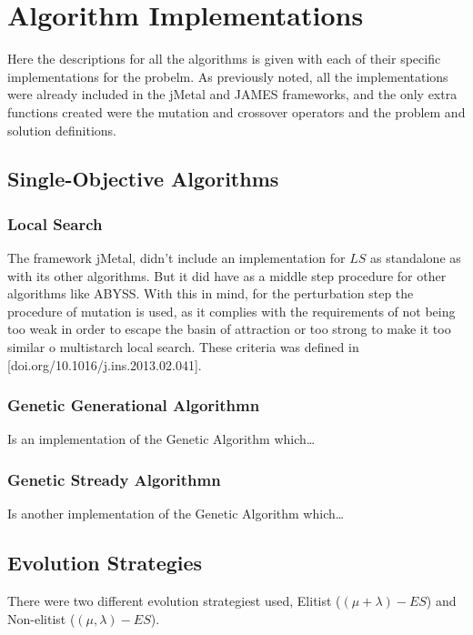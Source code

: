 \section{Algorithm Implementations}

Here the descriptions for all the algorithms is given with each of their specific implementations for the probelm. As previously noted, all the implementations were already included in the jMetal and JAMES frameworks, and the only extra functions created were the mutation and crossover operators and the problem and solution definitions.

\subsection{Single-Objective Algorithms}

\subsubsection{Local Search}

The framework jMetal, didn't include an implementation for $LS$ as standalone as with its other algorithms. But it did have as a middle step procedure for other algorithms like ABYSS. With this in mind, for the perturbation step the procedure of mutation is used, as it complies with the requirements of not being too weak in order to escape the basin of attraction or too strong to make it too similar o multistarch local search. These criteria was defined in [doi.org/10.1016/j.ins.2013.02.041].

\subsubsection{Genetic Generational Algorithmn}

Is an implementation of the Genetic Algorithm which\dots

\subsubsection{Genetic Stready Algorithmn}

Is another implementation of the Genetic Algorithm which\dots

\subsection{Evolution Strategies}

There were two different evolution strategiest used, Elitist ($(\mu + \lambda) - ES$) and Non-elitist ($(\mu, \lambda) - ES$).

